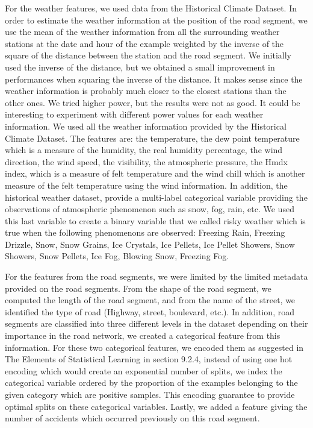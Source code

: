 \documentclass[conference]{IEEEtran}
\begin{document}
For the weather features, we used data from the Historical Climate Dataset. In order to estimate the weather information at the position of the road segment, we use the mean of the weather information from all the surrounding weather stations at the date and hour of the example weighted by the inverse of the square of the distance between the station and the road segment. We initially used the inverse of the distance, but we obtained a small improvement in performances when squaring the inverse of the distance. It makes sense since the weather information is probably much closer to the closest stations than the other ones. We tried higher power, but the results were not as good. It could be interesting to experiment with different power values for each weather information. We used all the weather information provided by the Historical Climate Dataset. The features are: the temperature, the dew point temperature which is a measure of the humidity, the real humidity percentage, the wind direction, the wind speed, the visibility, the atmospheric pressure, the Hmdx index, which is a measure of felt temperature and the wind chill which is another measure of the felt temperature using the wind information. In addition, the historical weather dataset, provide a multi-label categorical variable providing the observations of atmospheric phenomenon such as snow, fog, rain, etc. We used this last variable to create a binary variable that we called risky weather which is true when the following phenomenons are observed: Freezing Rain, Freezing Drizzle, Snow, Snow Grains, Ice Crystals, Ice Pellets, Ice Pellet Showers, Snow Showers, Snow Pellets, Ice Fog, Blowing Snow, Freezing Fog.

For the features from the road segments, we were limited by the limited metadata provided on the road segments. From the shape of the road segment, we computed the length of the road segment, and from the name of the street, we identified the type of road (Highway, street, boulevard, etc.). In addition, road segments are classified into three different levels in the dataset depending on their importance in the road network, we created a categorical feature from this information. For these two categorical features, we encoded them as suggested in The Elements of Statistical Learning\cite{elementsofstat} in section 9.2.4, instead of using one hot encoding which would create an exponential number of splits, we index the categorical variable ordered by the proportion of the examples belonging to the given category which are positive samples. This encoding guarantee to provide optimal splits on these categorical variables. Lastly, we added a feature giving the number of accidents which occurred previously on this road segment.
\end{document}
